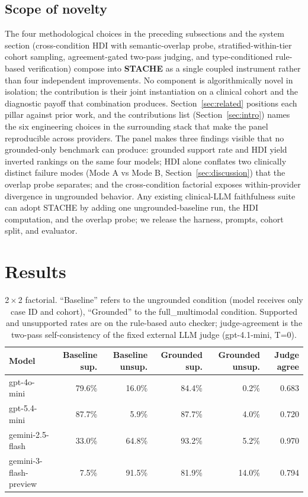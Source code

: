 \documentclass[11pt]{article}
\begin{document}
\subsection{Scope of novelty}
\label{sec:hqb}
The four methodological choices in the preceding subsections and the system section (cross-condition HDI with semantic-overlap probe, stratified-within-tier cohort sampling, agreement-gated two-pass judging, and type-conditioned rule-based verification) compose into \textbf{STACHE} as a single coupled instrument rather than four independent improvements. No component is algorithmically novel in isolation; the contribution is their joint instantiation on a clinical cohort and the diagnostic payoff that combination produces. Section~\ref{sec:related} positions each pillar against prior work, and the contributions list (Section~\ref{sec:intro}) names the six engineering choices in the surrounding stack that make the panel reproducible across providers. The panel makes three findings visible that no grounded-only benchmark can produce: grounded support rate and HDI yield inverted rankings on the same four models; HDI alone conflates two clinically distinct failure modes (Mode A vs Mode B, Section~\ref{sec:discussion}) that the overlap probe separates; and the cross-condition factorial exposes within-provider divergence in ungrounded behavior. Any existing clinical-LLM faithfulness suite can adopt STACHE by adding one ungrounded-baseline run, the HDI computation, and the overlap probe; we release the harness, prompts, cohort split, and evaluator.

\section{Results}
\label{sec:results}

\begin{table}[!t]
\centering
\small
\begin{tabular}{lrrrrr}
\toprule
\textbf{Model} & \textbf{Baseline sup.} & \textbf{Baseline unsup.} & \textbf{Grounded sup.} & \textbf{Grounded unsup.} & \textbf{Judge agree} \\
\midrule
gpt-4o-mini             & 79.6\% & 16.0\% & 84.4\% & 0.2\%  & 0.683 \\
gpt-5.4-mini            & 87.7\% & 5.9\%  & 87.7\% & 4.0\%  & 0.720 \\
gemini-2.5-flash        & 33.0\% & 64.8\% & 93.2\% & 5.2\%  & 0.970 \\
gemini-3-flash-preview  & 7.5\%  & 91.5\% & 81.9\% & 14.0\% & 0.794 \\
\bottomrule
\end{tabular}
\caption{2\,$\times$\,2 factorial. ``Baseline'' refers to the ungrounded condition (model receives only case ID and cohort), ``Grounded'' to the full\_multimodal condition. Supported and unsupported rates are on the rule-based auto checker; judge-agreement is the two-pass self-consistency of the fixed external LLM judge (gpt-4.1-mini, T=0).}
\label{tab:factorial}
\end{table}
\end{document}
